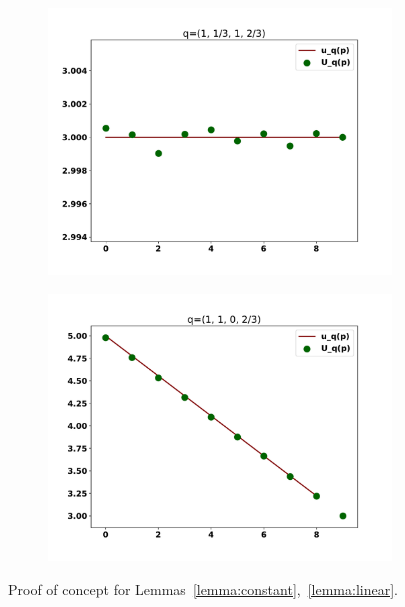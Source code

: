 \documentclass[10pt]{article}
\begin{document}
\begin{figure}[!htbp]
    \begin{center}
        \begin{subfigure}{0.45\textwidth}
            \includegraphics[width=\linewidth]{img/constant}
        \end{subfigure}
        \begin{subfigure}{0.45\textwidth}
            \includegraphics[width=\linewidth]{img/linear}
        \end{subfigure}
    \end{center}
    \caption{Proof of concept for Lemmas~\ref{lemma:constant},~\ref{lemma:linear}.}
    \label{fig:purely_lemmas}
\end{figure}
\end{document}
